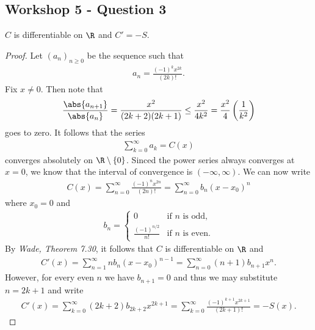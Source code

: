 \documentclass{article}
\begin{document}
\subsection*{Workshop 5 - Question 3}


\begin{claim*}
   $C$ is differentiable on $\R$ and $C'=-S$.
\end{claim*}
\begin{proof}
   Let $(a_n)_{n\geq 0}$ be the sequence such that
   \begin{align*}
      a_n = \frac{(-1)^{k}x^{2k}}{(2k)!}.
   \end{align*}
   Fix $x\not=0$. Then note that
   \begin{align*}
      \frac{\abs{a_{n+1}}}{\abs{a_n}} = \frac{x^2}{(2k+2)(2k+1)} \leq \frac{x^2}{4k^2} = \frac{x^2}{4}\left(\frac{1}{k^2}\right)
   \end{align*}
   goes to zero. It follows that the series
   \begin{align*}
      \sum_{k=0}^\infty a_k = C(x)
   \end{align*}
   converges absolutely on $\R\setminus\{0\}$. 
   Sinced the power series always converges at $x=0$, we know that the interval of convergence is $(-\infty,\infty)$.
   We can now write 
   \begin{align*}
      C(x) = \sum_{n=0}^\infty \frac{(-1)^{n}x^{2n}}{(2n)!} = \sum_{n=0}^\infty b_n(x-x_0)^n
   \end{align*}
   where $x_0=0$ and 
   \begin{align*}
      b_n = \begin{cases}
         0 &\text{if $n$ is odd},\\
         \frac{(-1)^{n/2}}{n!} &\text{if $n$ is even}.
      \end{cases}
   \end{align*}
   By \emph{Wade, Theorem 7.30}, it follows that $C$ is differentiable on $\R$ and 
   \begin{align*}
      C'(x) = \sum_{n=1}^\infty nb_n(x-x_0)^{n-1} = \sum_{n=0}^\infty (n+1)b_{n+1}x^n.
   \end{align*}
   However, for every even $n$ we have $b_{n+1}=0$ and thus we may substitute $n=2k+1$ and write 
   \begin{align*}
      C'(x) = \sum_{k=0}^\infty (2k+2)b_{2k+2}x^{2k+1}
      = \sum_{k=0}^\infty \frac{(-1)^{k+1}x^{2k+1}}{(2k+1)!}
      = -S(x).
   \end{align*}
\end{proof}
\end{document}
